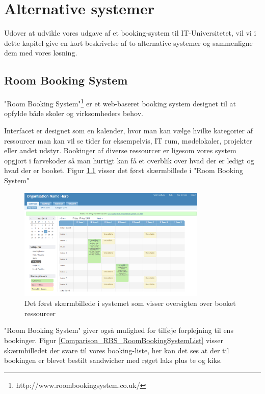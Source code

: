 \chapter{Alternative systemer}
\label{Comparison}
Udover at udvikle vores udgave af et booking-system til IT-Universitetet, vil vi i dette kapitel give en kort beskrivelse af to alternative  systemer og sammenligne dem med vores løsning.

\section{Room Booking System}
\label{Comparison_RBS}
"Room Booking System"\footnote{http://www.roombookingsystem.co.uk/} er et web-baseret booking system designet til at opfylde både skoler og virksomheders behov. 

Interfacet er designet som en kalender, hvor man kan vælge hvilke kategorier af ressourcer man kan vil se tider for eksempelvis, IT rum, mødelokaler, projekter eller andet udstyr. Bookinger af diverse ressourcer er ligesom vores system opgjort i farvekoder så man hurtigt kan få et overblik over hvad der er ledigt og hvad der er booket. Figur \ref{Comparison_RBS_RoomBookingSystem} visser det først skærmbillede i "Room Booking System"

\begin{figure}[h!]
  \centering
    \includegraphics[width=0.8\textwidth]{Appendix/GUI-Prototype/RoomBookingSystem}
  \caption{Det først skærmbillede i systemet som visser oversigten over booket ressourcer}
\label{Comparison_RBS_RoomBookingSystem}
\end{figure}

"Room Booking System" giver også mulighed for tilføje forplejning til ens bookinger. Figur \ref{Comparison_RBS_RoomBookingSystemList} visser skærmbilledet der svare til vores booking-liste, her kan det ses at der til bookingen er blevet bestilt sandwicher med røget laks plus te og kiks.

